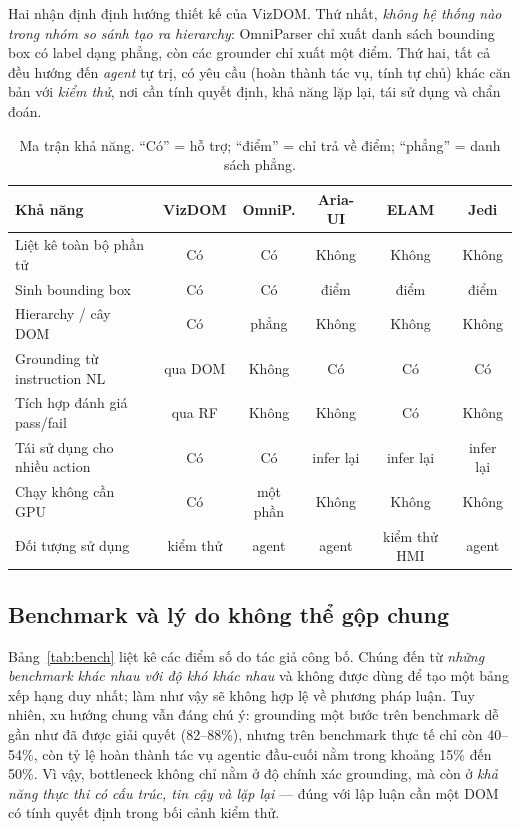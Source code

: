 \documentclass[11pt,a4paper]{article}
\begin{document}
Hai nhận định định hướng thiết kế của VizDOM. Thứ nhất, \emph{không hệ thống nào
trong nhóm so sánh tạo ra hierarchy}: OmniParser chỉ xuất danh sách bounding box có
label dạng phẳng, còn các grounder chỉ xuất một điểm. Thứ hai, tất cả đều hướng đến
\emph{agent} tự trị, có yêu cầu (hoàn thành tác vụ, tính tự chủ) khác căn bản với
\emph{kiểm thử}, nơi cần tính quyết định, khả năng lặp lại, tái sử dụng và chẩn đoán.

\begin{table}[H]
  \centering\footnotesize
  \caption{Ma trận khả năng. ``Có'' = hỗ trợ; ``điểm'' = chỉ trả về điểm;
  ``phẳng'' = danh sách phẳng.}
  \label{tab:capability}
  \begin{tabular}{@{}p{5.2cm}ccccc@{}}
    \toprule
    Khả năng & VizDOM & OmniP. & Aria-UI & ELAM & Jedi \\
    \midrule
    Liệt kê toàn bộ phần tử & Có & Có & Không & Không & Không \\
    Sinh bounding box & Có & Có & điểm & điểm & điểm \\
    Hierarchy / cây DOM & Có & phẳng & Không & Không & Không \\
    Grounding từ instruction NL & qua DOM & Không & Có & Có & Có \\
    Tích hợp đánh giá pass/fail & qua RF & Không & Không & Có & Không \\
    Tái sử dụng cho nhiều action & Có & Có & infer lại & infer lại & infer lại \\
    Chạy không cần GPU & Có & một phần & Không & Không & Không \\
    Đối tượng sử dụng & kiểm thử & agent & agent & kiểm thử HMI & agent \\
    \bottomrule
  \end{tabular}
\end{table}

\subsection{Benchmark và lý do không thể gộp chung}
Bảng~\ref{tab:bench} liệt kê các điểm số do tác giả công bố. Chúng đến từ
\emph{những benchmark khác nhau với độ khó khác nhau} và không được dùng để tạo một
bảng xếp hạng duy nhất; làm như vậy sẽ không hợp lệ về phương pháp luận. Tuy nhiên,
xu hướng chung vẫn đáng chú ý: grounding một bước trên benchmark dễ gần như đã
được giải quyết (82--88\%), nhưng trên benchmark thực tế chỉ còn 40--54\%, còn tỷ
lệ hoàn thành tác vụ agentic đầu-cuối nằm trong khoảng 15\% đến 50\%. Vì vậy,
bottleneck không chỉ nằm ở độ chính xác grounding, mà còn ở \emph{khả năng thực thi
có cấu trúc, tin cậy và lặp lại} --- đúng với lập luận cần một DOM có tính quyết
định trong bối cảnh kiểm thử.
\end{document}
